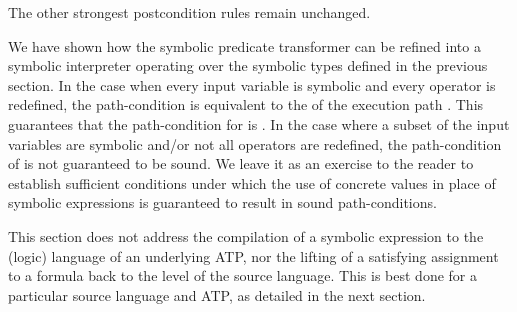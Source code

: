 \documentclass{IOS-Book-Article}
\begin{document}
\begin{mdP}[data-line={588}]%
{}The other strongest postcondition rules remain unchanged.%
\end{mdP}%
\begin{mdP}[data-line={592}]%
{}We have shown how the symbolic predicate transformer %
{}%
{} can 
be refined into a symbolic interpreter operating over the
symbolic types defined in the previous section.
In the case when every input variable is symbolic and every
operator is redefined, the path-condition is equivalent to the
{}%
{} of the execution path %
{}%
{}. 
This guarantees that the path-condition for %
{}%
{} is %
{}%
{}.
In the case where a subset of the input variables are symbolic
and/or not all operators are redefined, the path-condition of %
{}%
{} 
is not guaranteed to be sound. We leave it as an exercise to the
reader to establish sufficient conditions under which the 
use of concrete values in place of symbolic expressions is 
guaranteed to result in sound path-conditions.%
\end{mdP}%
\begin{mdP}[class={indent},data-line={606}]%
{}This section does not address the compilation of a symbolic
expression to the (logic) language of an underlying ATP, nor the
lifting of a satisfying assignment to a formula back to the
level of the source language. This is best done for a particular
source language and ATP, as detailed in the next section.%
\end{mdP}%
\end{document}

